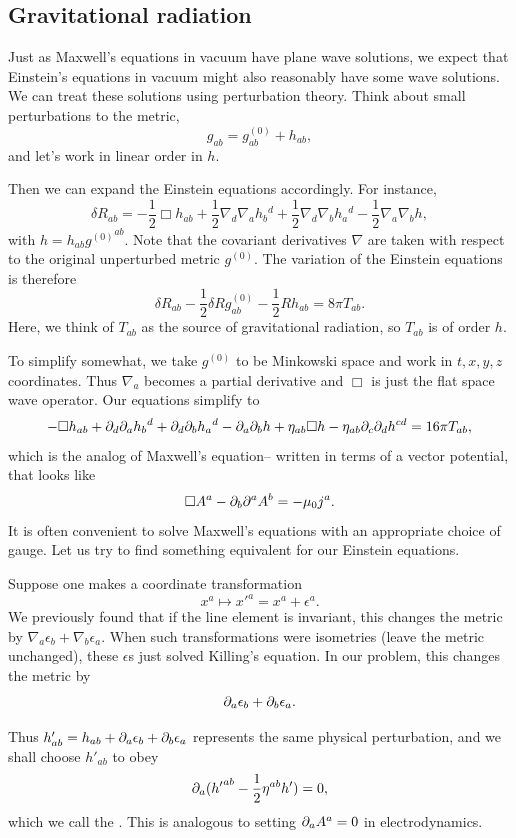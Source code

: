 \subsection*{Gravitational radiation} Just as Maxwell's equations in vacuum have plane wave solutions, we expect that Einstein's equations in vacuum might also reasonably have some wave solutions. We can treat these solutions using perturbation theory. Think about small perturbations to the metric,
$$g_{ab}=g_{ab}^{(0)}+h_{ab},$$
and let's work in linear order in $h$.

Then we can expand the Einstein equations accordingly. For instance,
$$\delta R_{ab}=-\frac{1}{2}\Box h_{ab}+\frac{1}{2}\nabla_d \nabla_a h_b{}^d +\frac{1}{2}\nabla_d \nabla_b h_a{}^d -\frac{1}{2}\nabla_a \nabla_b h,$$
with $h=h_{ab}{g^{(0)}}^{ab}$. Note that the covariant derivatives $\nabla$ are taken with respect to the original unperturbed metric $g^{(0)}$. The variation of the Einstein equations is therefore
$$\delta R_{ab}-\frac{1}{2}\delta R g_{ab}^{(0)} -\frac{1}{2}R h_{ab}=8\pi T_{ab}.$$
 Here, we think of $T_{ab}$ as the source of gravitational radiation, so $T_{ab}$ is of order $h$.

To simplify somewhat, we take $g^{(0)}$ to be Minkowski space and work in $t,x,y,z$ coordinates. Thus $\nabla_a$ becomes a partial derivative and $\Box$ is just the flat space wave operator. Our equations simplify to
$$-\Box h_{ab}+\p_d \p_a h_b{}^d +\p_d \p_b h_a{}^d -\p_a \p_b h%
+\eta_{ab}\Box h -\eta_{ab} \p_c \p_d h^{cd}
=16\pi T_{ab},$$
which is the analog of Maxwell's equation-- written in terms of a vector potential, that looks like
$$\Box A^a -\partial_b \partial^a A^b=-\mu_0 j^a.$$
It is often convenient to solve Maxwell's equations with an appropriate choice of gauge. Let us try to find something equivalent for our Einstein equations.

Suppose one makes a coordinate transformation
$$x^a \mapsto {x'}^a = x^a +\epsilon^a.$$
We previously found that if the line element is invariant, this changes the metric by $\nabla_a \epsilon_b +\nabla_b \epsilon_a$. When such transformations were isometries (leave the metric unchanged), these $\epsilon$s just solved Killing's equation. In our problem, this changes the metric by
$$\partial_a \epsilon_b +\partial_b \epsilon_a.$$

Thus $h'_{ab}=h_{ab}+\partial_a \epsilon_b +\partial_b \epsilon_a$ represents the same physical perturbation, and we shall choose $h'_{ab}$ to obey
$$\partial_a({h'}^{ab}-\frac{1}{2}\eta^{ab}h')=0,$$
which we call the . This is analogous to setting $\partial_a A^a =0$ in electrodynamics.

